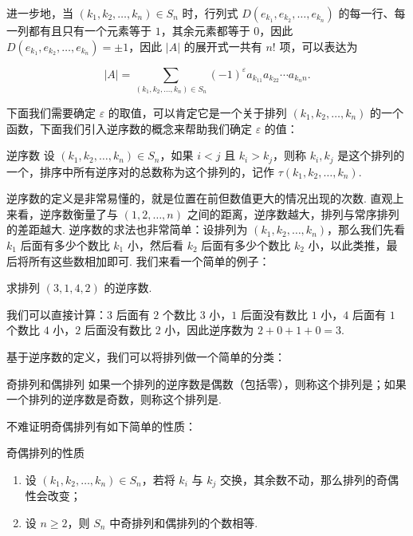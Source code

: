 进一步地，当 $(k_1,k_2,\ldots,k_n) \in S_n$ 时，行列式 $D(e_{k_1},e_{k_2},\ldots,e_{k_n})$ 的每一行、每一列都有且只有一个元素等于 $1$，其余元素都等于 $0$，因此 $D(e_{k_1},e_{k_2},\ldots,e_{k_n}) = \pm 1$，因此 $|A|$ 的展开式一共有 $n!$ 项，可以表达为

\[|A| = \sum\limits_{(k_1,k_2,\ldots,k_n)\in S_n} (-1)^\varepsilon a_{k_11}a_{k_22}\cdots a_{k_nn}.\]

下面我们需要确定 $\varepsilon$ 的取值，可以肯定它是一个关于排列 $(k_1, k_2, \ldots, k_n)$ 的一个函数，下面我们引入逆序数的概念来帮助我们确定 $\varepsilon$ 的值：

\begin{definition}{逆序数}{}
    设 $(k_1,k_2,\ldots,k_n) \in S_n$，如果 $i < j$ 且 $k_i > k_j$，则称 $k_i,k_j$ 是这个排列的一个，排序中所有逆序对的总数称为这个排列的，记作 $\tau(k_1,k_2,\ldots,k_n)$.
\end{definition}
逆序数的定义是非常易懂的，就是位置在前但数值更大的情况出现的次数. 直观上来看，逆序数衡量了与 $(1,2,\ldots,n)$ 之间的距离，逆序数越大，排列与常序排列的差距越大. 逆序数的求法也非常简单：设排列为 $(k_1,k_2,\ldots,k_n)$，那么我们先看 $k_1$ 后面有多少个数比 $k_1$ 小，然后看 $k_2$ 后面有多少个数比 $k_2$ 小，以此类推，最后将所有这些数相加即可. 我们来看一个简单的例子：

\begin{example}{}{}
    求排列 $(3,1,4,2)$ 的逆序数.
\end{example}

\begin{solution}
    我们可以直接计算：$3$ 后面有 $2$ 个数比 $3$ 小，$1$ 后面没有数比 $1$ 小，$4$ 后面有 $1$ 个数比 $4$ 小，$2$ 后面没有数比 $2$ 小，因此逆序数为 $2+0+1+0=3$.
\end{solution}

基于逆序数的定义，我们可以将排列做一个简单的分类：

\begin{definition}{奇排列和偶排列}{}
    如果一个排列的逆序数是偶数（包括零），则称这个排列是；如果一个排列的逆序数是奇数，则称这个排列是.
\end{definition}

不难证明奇偶排列有如下简单的性质：
\begin{example}{奇偶排列的性质}{}
    \begin{enumerate}
        \item 设 $(k_1,k_2,\ldots,k_n) \in S_n$，若将 $k_i$ 与 $k_j$ 交换，其余数不动，那么排列的奇偶性会改变；
        \item 设 $n \geqslant 2$，则 $S_n$ 中奇排列和偶排列的个数相等.
    \end{enumerate}
\end{example}

